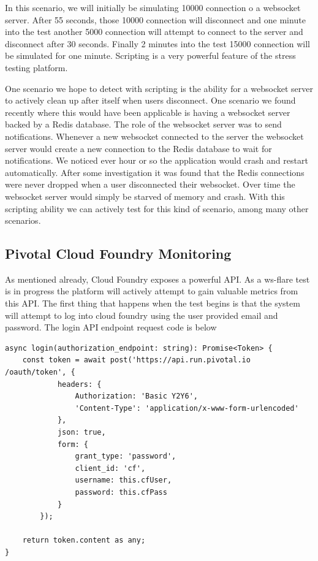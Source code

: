 In this scenario, we will initially be simulating 10000 connection o a websocket server. After 55 seconds, those 10000 connection will disconnect and one minute into the test another 5000 connection will attempt to connect to the server and disconnect after 30 seconds. Finally 2 minutes into the test 15000 connection will be simulated for one minute. Scripting is a very powerful feature of the stress testing platform. 

One scenario we hope to detect with scripting is the ability for a websocket server to actively clean up after itself when users disconnect. One scenario we found recently where this would have been applicable is having a websocket server backed by a Redis database. The role of the websocket server was to send notifications. Whenever a new websocket connected to the server the websocket server would create a new connection to the Redis database to wait for notifications. We noticed ever hour or so the application would crash and restart automatically. After some investigation it was found that the Redis connections were never dropped when a user disconnected their websocket. Over time the websocket server would simply be starved of memory and crash. With this scripting ability we can actively test for this kind of scenario, among many other scenarios.

\subsection{Pivotal Cloud Foundry Monitoring}

As mentioned already, Cloud Foundry exposes a powerful API. As a ws-flare test is in progress the platform will actively attempt to gain valuable metrics from this API. The first thing that happens when the test begins is that the system will attempt to log into cloud foundry using the user provided email and password. The login API endpoint request code is below

\begin{verbatim}
async login(authorization_endpoint: string): Promise<Token> {
    const token = await post('https://api.run.pivotal.io
/oauth/token', {
            headers: {
                Authorization: 'Basic Y2Y6',
                'Content-Type': 'application/x-www-form-urlencoded'
            },
            json: true,
            form: {
                grant_type: 'password',
                client_id: 'cf',
                username: this.cfUser,
                password: this.cfPass
            }
        });

    return token.content as any;
}
\end{verbatim}

